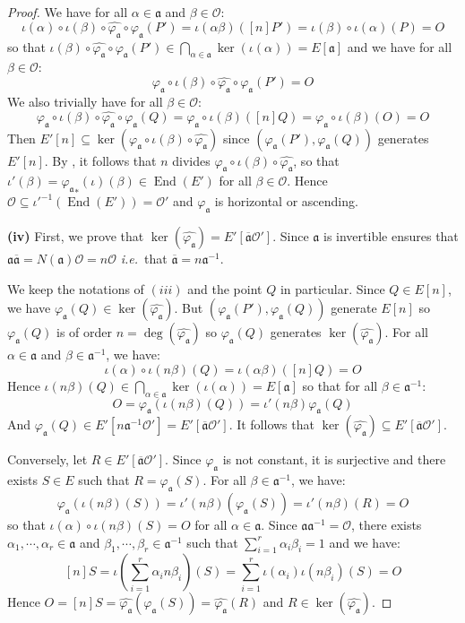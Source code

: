 \documentclass[a4paper,10pt]{report}
\theoremstyle{definition}
\theoremstyle{plain}
\theoremstyle{definition}
\newcommand{\ie}{\emph{i.e.}\ }
\newcommand{\mO}{\mathcal{O}}
\renewcommand{\(}{\left(}
\renewcommand{\)}{\right)}
\newcommand{\mf}[1]{\mathfrak{#1}}
\DeclareMathOperator{\End}{End}
\begin{document}
\begin{proof}
We have for all $\alpha\in \mf{a}$ and $\beta\in\mO$:
\[\iota(\alpha)\circ\iota(\beta)\circ\widehat{\varphi_{\mf{a}}}\circ\varphi_{\mf{a}}(P')=\iota(\alpha\beta)([n]P')=\iota(\beta)\circ\iota(\alpha)(P)=O\]
so that $\iota(\beta)\circ\widehat{\varphi_{\mf{a}}}\circ\varphi_{\mf{a}}(P')\in\bigcap_{\alpha\in\mf{a}}\ker(\iota(\alpha))=E[\mf{a}]$ and we have for all $\beta\in\mO$:
\[\varphi_{\mf{a}}\circ\iota(\beta)\circ\widehat{\varphi_{\mf{a}}}\circ\varphi_{\mf{a}}(P')=O\]
We also trivially have for all $\beta\in\mO$:
\[\varphi_{\mf{a}}\circ\iota(\beta)\circ\widehat{\varphi_{\mf{a}}}\circ\varphi_{\mf{a}}(Q)=\varphi_{\mf{a}}\circ\iota(\beta)([n]Q)=\varphi_{\mf{a}}\circ\iota(\beta)(O)=O\]
Then $E'[n]\subseteq \ker(\varphi_{\mf{a}}\circ\iota(\beta)\circ\widehat{\varphi_{\mf{a}}})$ since $(\varphi_{\mf{a}}(P'),\varphi_{\mf{a}}(Q))$ generates $E'[n]$.  By \cite[corollary III.4.11]{Silverman1}, it follows that $n$ divides $\varphi_{\mf{a}}\circ\iota(\beta)\circ\widehat{\varphi_{\mf{a}}}$, so that $\iota'(\beta)={\varphi_{\mf{a}}}_*(\iota)(\beta)\in\End(E')$ for all $\beta\in\mO$. Hence $\mO\subseteq\iota'^{-1}(\End(E'))=\mO'$ and $\varphi_{\mf{a}}$ is horizontal or ascending.

\textbf{(iv)} First, we prove that $\ker(\widehat{\varphi_{\mf{a}}})=E'[\overline{\mf{a}}\mO']$. Since $\mf{a}$ is invertible \cite[lemma 7.14.(iii)]{Cox} ensures that $\mf{a}\overline{\mf{a}}=N(\mf{a})\mO=n\mO$ \ie that $\overline{\mf{a}}=n\mf{a}^{-1}$. 

We keep the notations of $(iii)$ and the point $Q$ in particular. Since $Q\in E[n]$, we have $\varphi_{\mf{a}}(Q)\in\ker(\widehat{\varphi_{\mf{a}}})$. But $(\varphi_{\mf{a}}(P'),\varphi_{\mf{a}}(Q))$ generate $E[n]$ so $\varphi_{\mf{a}}(Q)$ is of order $n=\deg(\widehat{\varphi_{\mf{a}}})$ so $\varphi_{\mf{a}}(Q)$ generates $\ker(\widehat{\varphi_{\mf{a}}})$.  For all $\alpha\in\mf{a}$ and $\beta\in\mf{a}^{-1}$, we have:
\[\iota(\alpha)\circ\iota(n\beta)(Q)=\iota(\alpha \beta)([n]Q)=O\]
Hence $\iota(n\beta)(Q)\in\bigcap_{\alpha\in\mf{a}}\ker(\iota(\alpha))=E[\mf{a}]$ so that for all $\beta\in\mf{a}^{-1}$:
\[O=\varphi_{\mf{a}}(\iota(n\beta)(Q))=\iota'(n\beta)\varphi_{\mf{a}}(Q)\]
And $\varphi_{\mf{a}}(Q)\in E'[n\mf{a}^{-1}\mO']=E'[\overline{\mf{a}}\mO']$. It follows that $\ker(\widehat{\varphi_{\mf{a}}})\subseteq E'[\overline{\mf{a}}\mO']$. 


Conversely, let $R\in E'[\overline{\mf{a}}\mO']$. Since $\varphi_{\mf{a}}$ is not constant, it is surjective and there exists $S\in E$ such that $R=\varphi_{\mf{a}}(S)$. For all $\beta\in\mf{a}^{-1}$, we have:
\[\varphi_{\mf{a}}(\iota(n\beta)(S))=\iota'(n\beta)(\varphi_{\mf{a}}(S))=\iota'(n\beta)(R)=O\]
so that $\iota(\alpha)\circ \iota(n\beta)(S)=O$ for all $\alpha\in \mf{a}$. Since $\mf{a}\mf{a}^{-1}=\mO$, there exists $\alpha_1, \cdots, \alpha_r\in\mf{a}$ and $\beta_1, \cdots, \beta_r\in\mf{a}^{-1}$ such that $\sum_{i=1}^r \alpha_i\beta_i=1$ and we have:
\[[n]S=\iota\(\sum_{i=1}^r \alpha_i n\beta_i\)(S)=\sum_{i=1}^r\iota(\alpha_i)\iota(n\beta_i)(S)=O\]
Hence $O=[n]S=\widehat{\varphi_{\mf{a}}}(\varphi_{\mf{a}}(S))=\widehat{\varphi_{\mf{a}}}(R)$ and $R\in\ker(\widehat{\varphi_{\mf{a}}})$. 


\end{proof}
\end{document}
